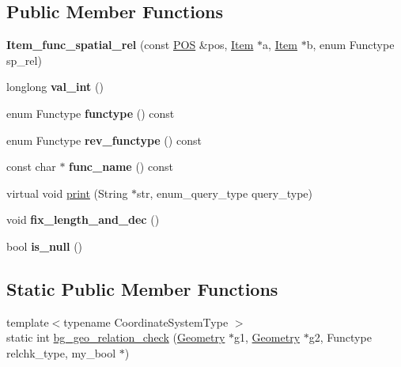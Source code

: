 \subsection*{Public Member Functions}
\begin{DoxyCompactItemize}
\item 
\mbox{\label{classItem__func__spatial__rel_ad36c800b6e229c232156d3e9ce90e06a}} 
{\bfseries Item\+\_\+func\+\_\+spatial\+\_\+rel} (const \mbox{\hyperlink{structYYLTYPE}{P\+OS}} \&pos, \mbox{\hyperlink{classItem}{Item}} $\ast$a, \mbox{\hyperlink{classItem}{Item}} $\ast$b, enum Functype sp\+\_\+rel)
\item 
\mbox{\label{classItem__func__spatial__rel_a1d4852777ee0521b862fc01916fe4cd6}} 
longlong {\bfseries val\+\_\+int} ()
\item 
\mbox{\label{classItem__func__spatial__rel_aa11227940e5f3d8123a9d75bd94fb473}} 
enum Functype {\bfseries functype} () const
\item 
\mbox{\label{classItem__func__spatial__rel_acb113b324f5e89c28452b469f8e1de95}} 
enum Functype {\bfseries rev\+\_\+functype} () const
\item 
\mbox{\label{classItem__func__spatial__rel_a17e7f32092713c87a543cd7d421be3ac}} 
const char $\ast$ {\bfseries func\+\_\+name} () const
\item 
virtual void \mbox{\hyperlink{classItem__func__spatial__rel_aa0e96f4e0cebc9ea671b253d885f4ab9}{print}} (String $\ast$str, enum\+\_\+query\+\_\+type query\+\_\+type)
\item 
\mbox{\label{classItem__func__spatial__rel_a710624b795a4bd29b58470c69a06ff90}} 
void {\bfseries fix\+\_\+length\+\_\+and\+\_\+dec} ()
\item 
\mbox{\label{classItem__func__spatial__rel_a69923ed2710373929dd2c2e68d09e7be}} 
bool {\bfseries is\+\_\+null} ()
\end{DoxyCompactItemize}
\subsection*{Static Public Member Functions}
\begin{DoxyCompactItemize}
\item 
{\footnotesize template$<$typename Coordinate\+System\+Type $>$ }\\static int \mbox{\hyperlink{classItem__func__spatial__rel_a498fe902a8326fa72073305c481d731e}{bg\+\_\+geo\+\_\+relation\+\_\+check}} (\mbox{\hyperlink{classGeometry}{Geometry}} $\ast$g1, \mbox{\hyperlink{classGeometry}{Geometry}} $\ast$g2, Functype relchk\+\_\+type, my\+\_\+bool $\ast$)
\end{DoxyCompactItemize}
